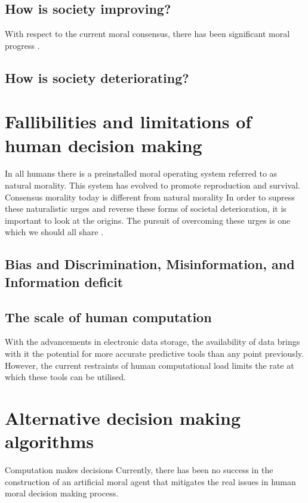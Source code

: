 \subsection{How is society improving?}
With respect to the current moral consensus, there has been significant moral progress \cite{pinker2011better}.

\subsection{How is society deteriorating?}

\section{Fallibilities and limitations of human decision making}
In all humans there is a preinstalled moral operating system referred to as natural morality.
This system has evolved to promote reproduction and survival.
Consensus morality today is different from natural morality
In order to supress these naturalistic urges and reverse these forms of societal deterioration, it is important to look at the origins.
The pursuit of overcoming these urges is one which we should all share \cite{nietzsche1968will}.

\subsection{Bias and Discrimination, Misinformation, and Information deficit}

\subsection{The scale of human computation}
With the advancements in electronic data storage, the availability of data brings with it the potential for more accurate predictive tools than any point previously.
However, the current restraints of human computational load limits the rate at which these tools can be utilised.

\section{Alternative decision making algorithms}
Computation makes decisions
Currently, there has been no success in the construction of an artificial moral agent that mitigates the real issues in human moral decision making process.

